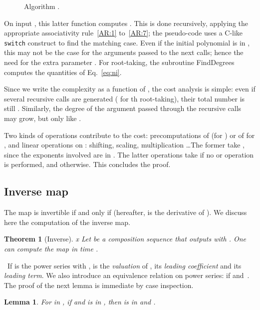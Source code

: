 \documentclass{sig-alternate}
\def\Eval {\ensuremath{\mathsf{Eval}}}
\def\myproof{\noindent{\sc Proof.}~}
\def\foorp{\hfill}
\newtheorem{theorem}{Theorem}
\newtheorem{Lemma}{Lemma}
\begin{document}
\begin{figure}[t]
\begin{center}
\fbox{
\begin{minipage}{5 cm}
\begin{tabbing}
\= \quad\quad\quad\quad\quad\quad\= \quad \= \quad \kill
\1mm]
\>  \\
\> {\sf return} \Eval{\sf \_aux}
\end{tabbing}
\end{minipage}
}
\end{center}
\caption{Algorithm .}
\label{Fig:1}
\end{figure}

On input , this latter function computes
. This is done recursively, applying the
appropriate associativity rule~\eqref{AR:1} to~\eqref{AR:7}; the
pseudo-code uses a C-like \texttt{switch} construct to find the
matching case. Even if the initial polynomial  is in ,
this may not be the case for the arguments passed to the next calls;
hence the need for the extra parameter . For root-taking, the
subroutine \textsf{FindDegrees} computes the quantities  of
Eq.~\eqref{eq:ni}.

Since we write the complexity as a function of , the cost analysis
is simple: even if several recursive calls are generated ( for
th root-taking), their total number is still . Similarly, the
degree of the argument  passed through the recursive calls may
grow, but only like . 

Two kinds of operations contribute to the cost: precomputations of
 (for ) or of
 for , and
linear operations on : shifting, scaling, multiplication \dots The
former take , since the exponents involved are in
. The latter operations take  if no  or 
operation is performed, and  otherwise. This
concludes the proof. \foorp




\subsection{Inverse map}  

The map  is invertible if and only if 
(hereafter,  is the derivative of ). We discuss here the
computation of the inverse map.
\begin{theorem}[Inverse]\label{Prop:1}x
  Let  be a composition sequence that outputs  with . One can compute the map
  in time .
\end{theorem}
\myproof If  is the power series 
with ,  is the \emph{valuation} of ,
 its \emph{leading coefficient} and  its \emph{leading term}.  We also introduce an equivalence
relation on power series:  if 
and~. The proof of the next lemma is
immediate by case inspection.
\begin{Lemma}For  in
, if  and  is in , then  is in
 and .
\end{Lemma}
\end{document}
